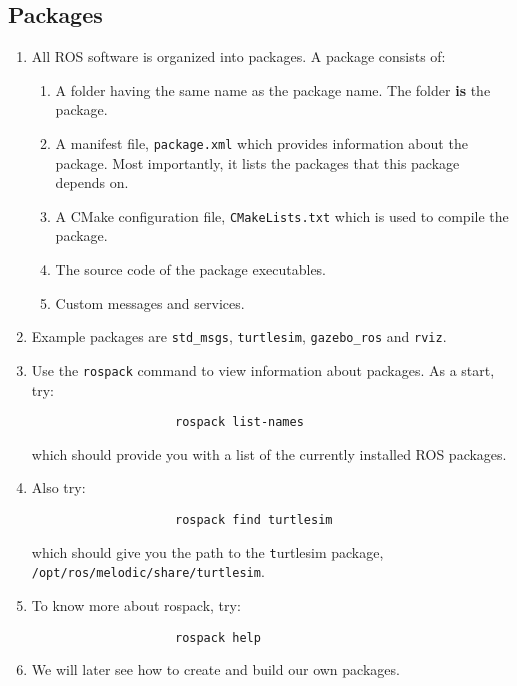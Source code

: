 \documentclass{article}
\begin{document}
        \subsection{Packages}
            \begin{enumerate}
                \item All ROS software is organized into packages. A package consists of:
                \begin{enumerate}
                    \item A folder having the same name as the package name. The folder \textbf{is} the package.
                    \item A manifest file, \texttt{package.xml} which provides information about the package. Most importantly, it lists the packages
                    that this package depends on.
                    \item A CMake configuration file, \texttt{CMakeLists.txt} which is used to compile the package.
                    \item The source code of the package executables.
                    \item Custom messages and services. 
                \end{enumerate}

                \item Example packages are \texttt{std\_msgs}, \texttt{turtlesim}, \texttt{gazebo\_ros} and \texttt{rviz}.
                \item Use the \texttt{rospack} command to view information about packages. As a start, try:
                \begin{verbatim}
                    rospack list-names
                \end{verbatim}
                which should provide you with a list of the currently installed ROS packages.
                \item Also try:
                \begin{verbatim}
                    rospack find turtlesim
                \end{verbatim}
                which should give you the path to the {\texttt turtlesim} package, \texttt{/opt/ros/melodic/share/turtlesim}.
                \item To know more about rospack, try:
                \begin{verbatim}
                    rospack help
                \end{verbatim}
                \item We will later see how to create and build our own packages.
            \end{enumerate}
\end{document}
